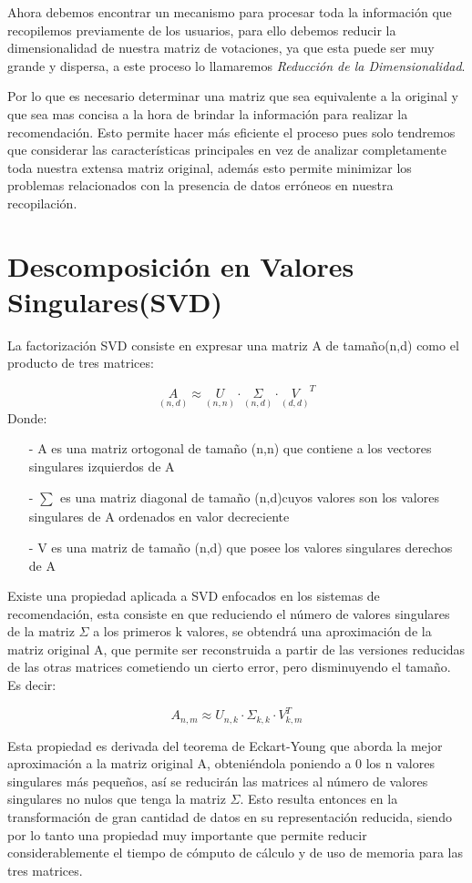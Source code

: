 \documentclass{article}
\begin{document}
Ahora debemos encontrar un mecanismo para procesar toda la información que recopilemos previamente de los usuarios, para ello debemos reducir la dimensionalidad de nuestra matriz de votaciones, ya que esta puede ser muy grande y dispersa, a este proceso lo llamaremos \textit{Reducción de la Dimensionalidad}. 

Por lo que es necesario determinar una matriz que sea equivalente a la original y que sea mas concisa a la hora de brindar la información para realizar la recomendación. Esto permite hacer más eficiente el proceso pues solo tendremos que considerar las características principales en vez de analizar completamente toda nuestra extensa matriz original, además esto permite minimizar los problemas relacionados con la presencia de datos erróneos en nuestra recopilación.

\section{Descomposición en Valores Singulares(SVD)}

La factorización SVD consiste en expresar una matriz A de tamaño(n,d) como el producto de tres matrices:

$$ \underset{(n, d)}A \approx \underset{(n, n)}U \cdot \underset{(n, d)}\Sigma \cdot \underset{(d, d)} V^T  $$
Donde:
\begin{enumerate}
	\item[-] A es una matriz ortogonal de tamaño (n,n) que contiene a los vectores singulares izquierdos de A
	\item[-] $\sum_{}^{}$ es una matriz diagonal de tamaño (n,d)cuyos valores son los valores singulares de A ordenados en valor decreciente
	\item[-] V es una matriz de tamaño (n,d) que posee los valores singulares derechos de A
\end{enumerate}

Existe una propiedad 
aplicada a SVD enfocados en los sistemas 
de recomendación, esta consiste en que 
reduciendo el número de valores singulares 
de la matriz $\Sigma$ a los primeros k valores, se 
obtendrá una aproximación de la matriz 
original A, que permite ser reconstruida a 
partir de las versiones reducidas de las otras 
matrices cometiendo un cierto error, pero 
disminuyendo el tamaño. Es decir: 

$$ 
A_{n, m} \approx U_{n, k} \cdot \Sigma_{k, k} \cdot V^T_{k, m}  
$$

Esta propiedad es derivada del 
teorema de Eckart-Young que aborda 
la mejor aproximación a la matriz original 
A, obteniéndola poniendo a 0 los n valores 
singulares más pequeños, así se reducirán 
las matrices al número de valores singulares 
no nulos que tenga la matriz $\Sigma$. Esto resulta 
entonces en la transformación de gran cantidad 
de datos en su representación reducida, siendo 
por lo tanto una propiedad muy importante 
que permite reducir considerablemente el 
tiempo de cómputo de cálculo y de uso de 
memoria para las tres matrices.
\end{document}
